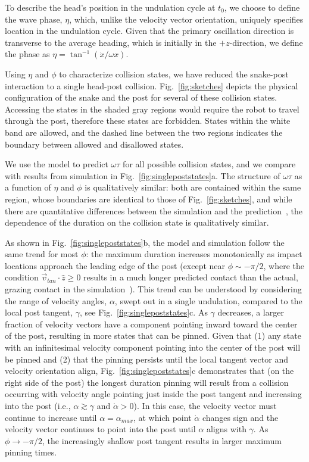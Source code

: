 \documentclass[aps,pre,twocolumn,superscriptaddress]{revtex4-1}
\begin{document}
To describe the head's position in the undulation cycle at $t_0$, we choose to define the wave phase, $\eta$, which, unlike the velocity vector orientation, uniquely specifies location in the undulation cycle. Given that the primary oscillation direction is transverse to the average heading, which is initially in the $+z$-direction, we define the phase as $\eta = \tan^{-1}(\dot{x}/\omega x)$. 

Using $\eta$ and $\phi$ to characterize collision states, we have reduced the snake-post interaction to a single head-post collision. Fig.~\ref{fig:sketches} depicts the physical configuration of the snake and the post for several of these collision states. Accessing the states in the shaded gray regions would require the robot to travel through the post, therefore these states are forbidden. States within the white band are allowed, and the dashed line between the two regions indicates the boundary between allowed and disallowed states.

We use the model to predict $\omega \tau$ for all possible collision states, and we compare with results from simulation in Fig.~\ref{fig:singlepoststates}a. The structure of $\omega \tau$ as a function of $\eta$ and $\phi$ is qualitatively similar: both are contained within the same region, whose boundaries are identical to those of Fig.~\ref{fig:sketches}, and while there are quantitative differences between the simulation and the prediction~\cite{supplemental}, the dependence of the duration on the collision state is qualitatively similar. 

As shown in Fig.~\ref{fig:singlepoststates}b, the model and simulation follow the same trend for most $\phi$: the maximum duration increases monotonically as impact locations approach the leading edge of the post (except near $\phi \sim -\pi/2$, where the condition $\vec{v}_{tan} \cdot \hat{z} \geq 0$ results in a much longer predicted contact than the actual, grazing contact in the simulation~\cite{supplemental}). This trend can be understood by considering the range of velocity angles, $\alpha$, swept out in a single undulation, compared to the local post tangent, $\gamma$, see Fig.~\ref{fig:singlepoststates}c. As $\gamma$ decreases, a larger fraction of velocity vectors have a component pointing inward toward the center of the post, resulting in more states that can be pinned. Given that (1) any state with an infinitesimal velocity component pointing into the center of the post will be pinned and (2) that the pinning persists until the local tangent vector and velocity orientation align, Fig.~\ref{fig:singlepoststates}c demonstrates that (on the right side of the post) the longest duration pinning will result from a collision occurring with velocity angle pointing just inside the post tangent and increasing into the post (i.e., $\alpha \gtrsim \gamma$ and $\dot{\alpha} > 0$). In this case, the velocity vector must continue to increase until $\alpha = \alpha_{max}$, at which point $\dot{\alpha}$ changes sign and the velocity vector continues to point into the post until $\alpha$ aligns with $\gamma$. As $\phi \to -\pi/2$, the increasingly shallow post tangent results in larger maximum pinning times.    
\end{document}
